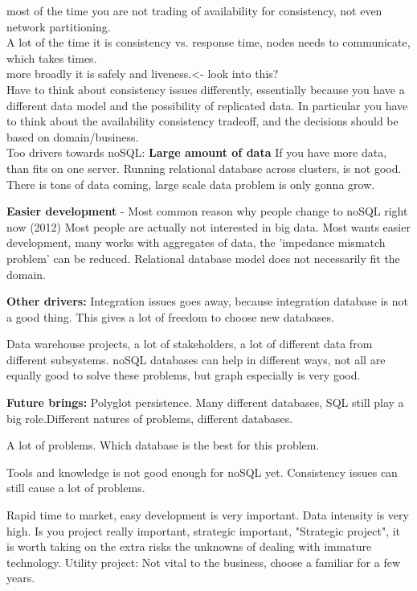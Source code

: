 {most of the time you are not trading of availability for consistency, not even network partitioning.\\
A lot of the time it is consistency vs. response time, nodes needs to communicate, which takes times.\\
more broadly it is safely and liveness.<- look into this? \\

Have to think about consistency issues differently, essentially because you have a different data model and the possibility of replicated data. In particular you have to think about the availability consistency tradeoff, and the decisions should be based on domain/business.\\

Too drivers towards noSQL:
\textbf{Large amount of data}
If you have more data, than fits on one server. Running relational database across clusters, is not good.\\
There is tons of data coming, large scale data problem is only gonna grow. 

\textbf{Easier development} - Most common reason why people change to noSQL right now (2012)
Most people are actually not interested in big data.
Most wants easier development, many works with aggregates of data, the 'impedance mismatch problem' can be reduced. Relational database model does not necessarily fit the domain.

\textbf{Other drivers:}
Integration issues goes away, because integration database is not a good thing. This gives a lot of freedom to choose new databases.

Data warehouse projects, a lot of stakeholders, a lot of different data from different subsystems. noSQL databases can help in different ways, not all are equally good to solve these problems, but graph especially is very good.

\textbf{Future brings:}
Polyglot persistence. Many different databases, SQL still play a big role.Different natures of problems, different databases.

A lot of problems. Which database is the best for this problem. 

Tools and knowledge is not good enough for noSQL yet. Consistency issues can still cause a lot of problems.

Rapid time to market, easy development is very important. Data intensity is very high. Is you project really important, strategic important, "Strategic project", it is worth taking on the extra risks the unknowns of dealing with immature technology. Utility project: Not vital to the business, choose a familiar for a few years.

}

